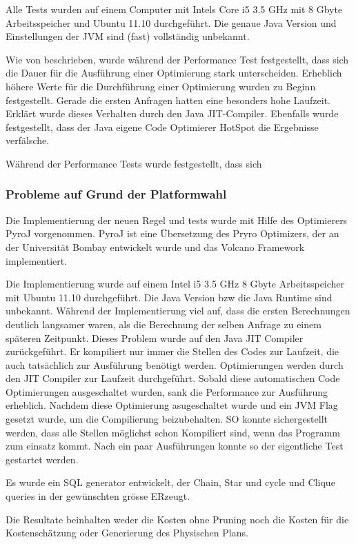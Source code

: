 Alle Tests wurden auf einem Computer mit Intels Core i5 3.5 GHz mit 8 Gbyte Arbeitsspeicher und Ubuntu 11.10 durchgeführt. Die genaue Java Version und Einstellungen der JVM sind (fast) vollständig unbekannt.

Wie von \cite{shanbhag2014optimizing} beschrieben, wurde während der Performance Test festgestellt, dass sich die Dauer für die Ausführung einer Optimierung stark unterscheiden. Erheblich höhere Werte für die Durchführung einer Optimierung wurden zu Beginn festgestellt. Gerade die ersten Anfragen hatten eine besonders hohe Laufzeit. Erklärt wurde dieses Verhalten durch den Java \ac{JIT}-Compiler. Ebenfalls wurde festgestellt, dass der Java eigene Code Optimierer HotSpot die Ergebnisse verfälsche. 

Während der Performance Tests wurde festgestellt, dass sich


\subsubsection{Probleme auf Grund der Platformwahl}
Die Implementierung der neuen Regel und tests wurde mit Hilfe des Optimierers PyroJ vorgenommen. PyroJ ist eine Übersetzung des Pryro Optimizers, der an der Universität Bombay entwickelt wurde und das Volcano Framework implementiert. 

Die Implementierung wurde auf einem Intel i5 3.5 GHz 8 Gbyte Arbeitsspeicher mit Ubuntu 11.10 durchgeführt. Die Java Version bzw die Java Runtime sind unbekannt. Während der Implementierung viel auf, dass die ersten Berechnungen deutlich langsamer waren, als die Berechnung der selben Anfrage zu einem späteren Zeitpunkt. Dieses Problem wurde auf den Java JIT Compiler zurückgeführt. Er kompiliert nur immer die Stellen des Codes zur Laufzeit, die auch tatsächlich zur Ausführung benötigt werden. Optimierungen werden durch den JIT Compiler zur Laufzeit durchgeführt. Sobald diese automatischen Code Optimierungen ausgeschaltet wurden, sank die Performance zur Ausführung erheblich. Nachdem diese Optimierung asugeschaltet wurde und ein JVM Flag gesetzt wurde, um die Compilierung beizubehalten. SO konnte sichergestellt werden, dass alle Stellen möglichst schon Kompiliert sind, wenn das Programm zum einsatz kommt. Nach ein paar Ausführungen konnte so der eigentliche Test gestartet werden.




Es wurde ein SQL generator entwickelt, der Chain, Star und cycle und Clique queries in der gewünschten grösse ERzeugt.


Die Resultate beinhalten weder die Kosten ohne Pruning noch die Kosten für die Kostenschätzung oder Generierung des Physischen Plans. 

